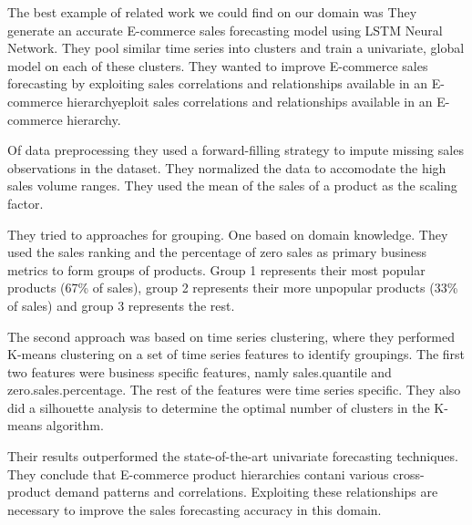 
%
%

The best example of related work we could find on our domain was 
\cite{Bandara2019}
They generate an accurate E-commerce sales forecasting model using LSTM  Neural Network.
They pool similar time series into clusters and train a univariate, global model on each of these 
clusters.
They wanted to improve E-commerce sales forecasting by 
exploiting sales correlations and relationships available in an E-commerce hierarchyeploit sales correlations and relationships available in an E-commerce hierarchy.

Of data preprocessing they used a forward-filling strategy to impute missing sales
observations in the dataset. They normalized the data to accomodate the high
sales volume ranges. They used the mean of the sales of a product as the scaling factor.

They tried to approaches for grouping. One based on domain knowledge.
They used the sales ranking and the percentage of zero sales as primary business metrics
to form groups of products. Group 1 represents their most popular products (67\% of sales), group 2 represents
their more unpopular products (33\% of sales) and group 3 represents the rest.

The second approach was based on time series clustering, where they performed K-means
clustering on a set of time series features to identify groupings. The first two features
were business specific features, namly sales.quantile and zero.sales.percentage.
The rest of the features were time series specific.
They also did a silhouette analysis to determine the optimal number of clusters in the K-means algorithm.

Their results outperformed the state-of-the-art univariate forecasting techniques.
They conclude that E-commerce product hierarchies contani various cross-product demand
patterns and correlations. Exploiting these relationships are necessary to improve the sales forecasting
accuracy in this domain.

